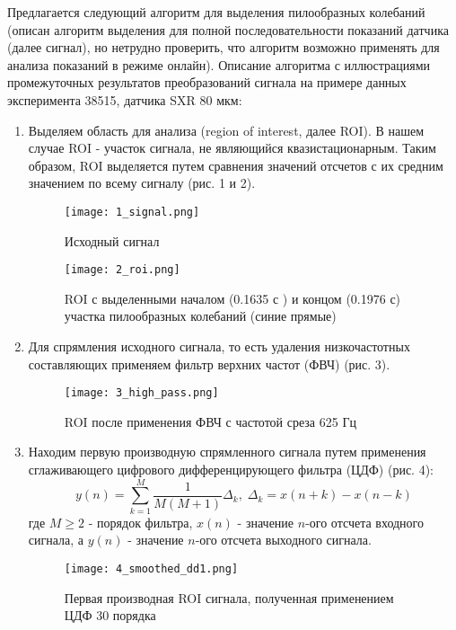 \documentclass{report}
\begin{document}
Предлагается следующий алгоритм для выделения пилообразных колебаний (описан алгоритм выделения для полной последовательности показаний датчика (далее сигнал), но нетрудно проверить, что алгоритм возможно применять для анализа показаний в режиме онлайн). Описание алгоритма с иллюстрациями промежуточных результатов преобразований сигнала на примере данных эксперимента 38515, датчика SXR 80 мкм:
\begin{enumerate}
    \item Выделяем область для анализа (region of interest, далее ROI). В нашем случае ROI - участок сигнала, не являющийся квазистационарным. Таким образом, ROI выделяется путем сравнения значений отсчетов с их средним значением по всему сигналу (рис. 1 и 2).
    \begin{figure}[H]
         \centering
         \captionsetup{justification=centering}
         \texttt{[image: 1\_signal.png]}
         \caption{Исходный сигнал}\label{Fig:Data1}
    \end{figure}
    \begin{figure}[H]
         \centering
         \captionsetup{justification=centering}
         \texttt{[image: 2\_roi.png]}
         \caption{ROI с выделенными началом (0.1635 с ) и концом (0.1976 с) участка пилообразных колебаний (синие прямые)}\label{Fig:Data1}
    \end{figure}
    \item Для спрямления исходного сигнала, то есть удаления низкочастотных составляющих применяем фильтр верхних частот (ФВЧ) (рис. 3).
    \begin{figure}[H]
         \centering
         \captionsetup{justification=centering}
         \texttt{[image: 3\_high\_pass.png]}
         \caption{ROI после применения ФВЧ с частотой среза 625 Гц}\label{Fig:Data1}
    \end{figure}
    \item Находим первую производную спрямленного сигнала путем применения сглаживающего цифрового дифференцирующего фильтра (ЦДФ) \cite{paper1} (рис. 4):
    \[y(n)=\sum_{k=1}^{M} \frac{1}{M(M+1)} \Delta_k, \; \Delta_k=x(n+k)-x(n-k)\]
    где $M \geq 2$ - порядок фильтра, $x(n)$ - значение $n$-ого отсчета входного сигнала, а $y(n)$ - значение $n$-ого отсчета выходного сигнала.
    \begin{figure}[H]
         \centering
         \captionsetup{justification=centering}
         \texttt{[image: 4\_smoothed\_dd1.png]}
         \caption{Первая производная ROI сигнала, полученная применением ЦДФ 30 порядка}\label{Fig:Data1}

\end{figure}
\end{enumerate}
\end{document}
